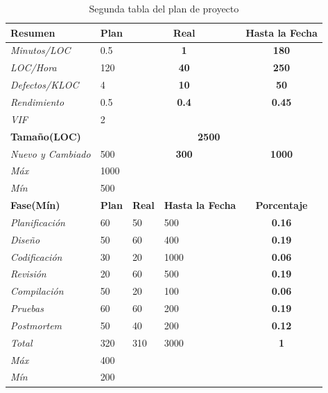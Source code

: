 \documentclass[a4paper,12pt,openany,oneside]{book}
\begin{document}
\begin{table}[!ht]
\begin{tabular}{| l | l | l | l | l | l |}
\hline
\textbf{Resumen} & \textbf{Plan} & \multicolumn{2}{|c|}{\textbf{Real}} & \multicolumn{2}{|c|}{\textbf{Hasta la Fecha}} \\
\hline
\textit{Minutos/LOC} & 0.5 & \multicolumn{2}{|c|}{\textbf{1}} & \multicolumn{2}{|c|}{\textbf{180}} \\
\hline
\textit{LOC/Hora} & 120 & \multicolumn{2}{|c|}{\textbf{40}} & \multicolumn{2}{|c|}{\textbf{250}} \\
\hline
\textit{Defectos/KLOC} & 4 & \multicolumn{2}{|c|}{\textbf{10}} & \multicolumn{2}{|c|}{\textbf{50}} \\
\hline
\textit{Rendimiento} & 0.5 & \multicolumn{2}{|c|}{\textbf{0.4}} & \multicolumn{2}{|c|}{\textbf{0.45}} \\
\hline
\textit{VIF} & 2 & \multicolumn{2}{|c|}{\textbf{}} & \multicolumn{2}{|c|}{\textbf{}} \\
\hline
\textbf{Tamaño(LOC)} & \multicolumn{5}{|c|}{\textbf{2500}}\\
\hline
\textit{Nuevo y Cambiado} & 500 & \multicolumn{2}{|c|}{\textbf{300}} & \multicolumn{2}{|c|}{\textbf{1000}} \\
\hline
\textit{Máx} & 1000 & \multicolumn{4}{|c|}{\textbf{}}\\
\hline
\textit{Mín} & 500  & \multicolumn{4}{|c|}{\textbf{}}\\
\hline
\textbf{Fase(Mín)} & \textbf{Plan} & \textbf{Real} & \textbf{Hasta la Fecha} & \multicolumn{2}{|c|}{\textbf{Porcentaje}} \\
\hline
\textit{Planificación} & 60 & 50  & 500  & \multicolumn{2}{|c|}{\textbf{0.16}}\\
\hline
\textit{Diseño} &        50 & 60  & 400  & \multicolumn{2}{|c|}{\textbf{0.19}}\\
\hline
\textit{Codificación} &  30 & 20  & 1000 & \multicolumn{2}{|c|}{\textbf{0.06}}\\
\hline
\textit{Revisión} &      20 & 60  & 500  & \multicolumn{2}{|c|}{\textbf{0.19}}\\
\hline
\textit{Compilación} &   50 & 20  & 100  & \multicolumn{2}{|c|}{\textbf{0.06}}\\
\hline
\textit{Pruebas} &       60 & 60  & 200  & \multicolumn{2}{|c|}{\textbf{0.19}}\\
\hline
\textit{Postmortem} &    50 & 40  & 200  & \multicolumn{2}{|c|}{\textbf{0.12}}\\
\hline
\textit{Total} &		320 & 310 & 3000 & \multicolumn{2}{|c|}{\textbf{1}}\\
\hline
\textit{Máx} & 			400	& \multicolumn{4}{|c|}{\textbf{}}\\
\hline
\textit{Mín} & 			200 & \multicolumn{4}{|c|}{\textbf{}}\\
\hline
\end{tabular}
\caption{Segunda tabla del plan de proyecto}
\end{table}
\end{document}
